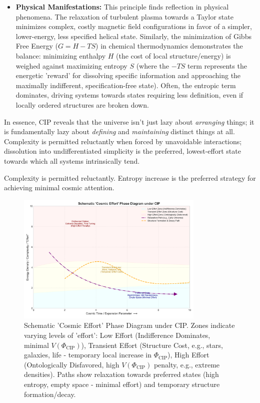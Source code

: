 \documentclass[11pt, a4paper]{article}
\newcommand{\subt}[1]{\mathrm{#1}}
\begin{document}
\begin{itemize}
    \item \textbf{Physical Manifestations:} This principle finds reflection in physical phenomena. The relaxation of turbulent plasma towards a Taylor state minimizes complex, costly magnetic field configurations in favor of a simpler, lower-energy, less specified helical state. Similarly, the minimization of Gibbs Free Energy ($G = H - TS$) in chemical thermodynamics demonstrates the balance: minimizing enthalpy $H$ (the cost of local structure/energy) is weighed against maximizing entropy $S$ (where the $-TS$ term represents the energetic 'reward' for dissolving specific information and approaching the maximally indifferent, specification-free state). Often, the entropic term dominates, driving systems towards states requiring less definition, even if locally ordered structures are broken down.
\end{itemize}

In essence, CIP reveals that the universe isn't just lazy about \textit{arranging} things; it is fundamentally lazy about \textit{defining} and \textit{maintaining} distinct things at all. Complexity is permitted reluctantly when forced by unavoidable interactions; dissolution into undifferentiated simplicity is the preferred, lowest-effort state towards which all systems intrinsically tend.

Complexity is permitted reluctantly. Entropy increase is the preferred strategy for achieving minimal cosmic attention.

\begin{figure}[H]
    \centering
    \includegraphics[width=0.8\textwidth]{CIP_PhaseDiagram.png}
    \caption[Schematic 'Cosmic Effort' Phase Diagram under CIP]{Schematic 'Cosmic Effort' Phase Diagram under CIP. Zones indicate varying levels of 'effort': Low Effort (Indifference Dominates, minimal $V(\Phi_{\subt{CIP}})$), Transient Effort (Structure Cost, e.g., stars, galaxies, life - temporary local increase in $\Phi_{\subt{CIP}}$), High Effort (Ontologically Disfavored, high $V(\Phi_{\subt{CIP}})$ penalty, e.g., extreme densities). Paths show relaxation towards preferred states (high entropy, empty space - minimal effort) and temporary structure formation/decay.}
    \label{fig:phase_diagram}
\end{figure}
\end{document}

